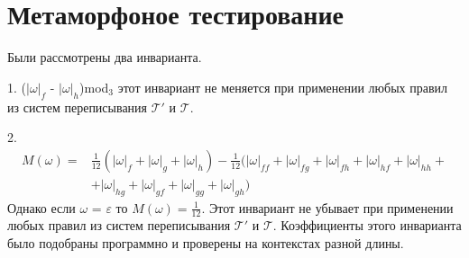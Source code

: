 \documentclass[a4paper, 14pt]{extarticle}
\begin{document}
\section{Метаморфоное тестирование}
Были рассмотрены два инварианта.

1. ($|\omega|_f$ - $|\omega|_h$)mod$_3$ этот инвариант не меняется при применении любых правил из систем переписывания $\mathcal{T}'$ и $\mathcal{T}$.

2. \[
\begin{aligned}
M(\omega) ={} & \frac{1}{12}(|\omega|_f + |\omega|_g + |\omega|_h) - \frac{1}{12}(|\omega|_{ff} + |\omega|_{fg} + |\omega|_{fh} +  |\omega|_{hf} +  |\omega|_{hh} + \\
&+ |\omega|_{hg} +  |\omega|_{gf} +  |\omega|_{gg} +  |\omega|_{gh})
\end{aligned} 
\]
Однако если $\omega$ = $\varepsilon$ то $M(\omega) = \frac{1}{12}$.
Этот инвариант не убывает при применении любых правил из систем переписывания $\mathcal{T}'$ и $\mathcal{T}$. Коэффициенты этого инварианта было подобраны программно и проверены на контекстах разной длины.
\end{document}
